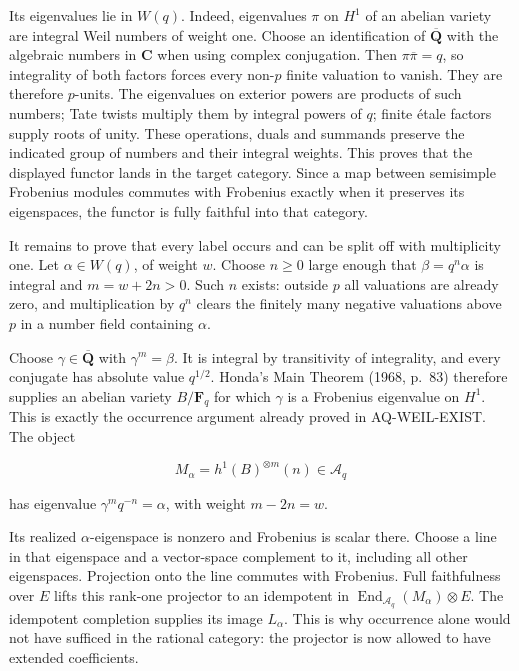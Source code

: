 Its eigenvalues lie in \(W(q)\). Indeed, eigenvalues \(\pi\) on \(H^1\)
of an abelian variety are integral Weil numbers of weight one. Choose an
identification of \(\overline{\mathbf Q}\) with the algebraic numbers in
\(\mathbf C\) when using complex conjugation. Then
\(\pi\overline{\pi}=q\), so integrality of both factors forces every
non-\(p\) finite valuation to vanish. They are therefore \(p\)-units.
The eigenvalues on exterior powers are products of such numbers; Tate
twists multiply them by integral powers of \(q\); finite étale factors
supply roots of unity. These operations, duals and summands preserve the
indicated group of numbers and their integral weights. This proves that
the displayed functor lands in the target category. Since a map between
semisimple Frobenius modules commutes with Frobenius exactly when it
preserves its eigenspaces, the functor is fully faithful into that
category.

It remains to prove that every label occurs and can be split off with
multiplicity one. Let \(\alpha\in W(q)\), of weight \(w\). Choose
\(n\ge0\) large enough that \(\beta=q^n\alpha\) is integral and
\(m=w+2n>0\). Such \(n\) exists: outside \(p\) all valuations are
already zero, and multiplication by \(q^n\) clears the finitely many
negative valuations above \(p\) in a number field containing \(\alpha\).

Choose \(\gamma\in\overline{\mathbf Q}\) with \(\gamma^m=\beta\). It is
integral by transitivity of integrality, and every conjugate has
absolute value \(q^{1/2}\). Honda's Main Theorem (1968, p.~83) therefore
supplies an abelian variety \(B/\mathbf F_q\) for which \(\gamma\) is a
Frobenius eigenvalue on \(H^1\). This is exactly the occurrence argument
already proved in AQ-WEIL-EXIST. The object

\[
 M_\alpha=h^1(B)^{\otimes m}(n)\in\mathcal A_q
\]

has eigenvalue \(\gamma^m q^{-n}=\alpha\), with weight \(m-2n=w\).

Its realized \(\alpha\)-eigenspace is nonzero and Frobenius is scalar
there. Choose a line in that eigenspace and a vector-space complement to
it, including all other eigenspaces. Projection onto the line commutes
with Frobenius. Full faithfulness over \(E\) lifts this rank-one
projector to an idempotent in
\(\operatorname{End}_{\mathcal A_q}(M_\alpha)\otimes E\). The idempotent
completion supplies its image \(L_\alpha\). This is why occurrence alone
would not have sufficed in the rational category: the projector is now
allowed to have extended coefficients.


